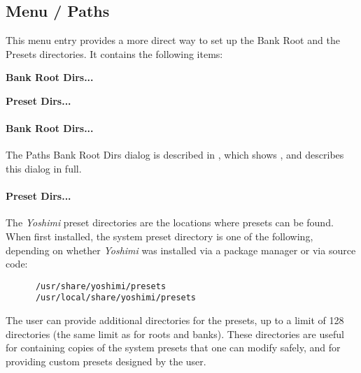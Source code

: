 %
% 





%

\subsection{Menu / Paths}
\label{subsec:menu_paths}

   This menu entry provides a more direct way to set up the Bank Root and
   the Presets directories.  It contains the following items:

   \begin{enumber}
      \item \textbf{Bank Root Dirs...}
      \item \textbf{Preset Dirs...}
   \end{enumber}

   \paragraph{Bank Root Dirs...}
   The Paths Bank Root Dirs dialog is described in
   ,
   which shows
   , and describes this dialog in full.

   \paragraph{Preset Dirs...}
   The \textsl{Yoshimi} preset directories are the locations where
   presets can be found.  When first installed, the system
   preset directory is one of the following, depending on whether
   \textsl{Yoshimi} was installed via a package manager or via source code:

   \begin{verbatim}
      /usr/share/yoshimi/presets
      /usr/local/share/yoshimi/presets
   \end{verbatim}
   
   The user can provide additional directories for the presets, up to a limit
   of 128 directories (the same limit as for roots and banks).
   These directories are useful for containing copies of the system
   presets that one can modify safely, and for providing custom
   presets designed by the user.

